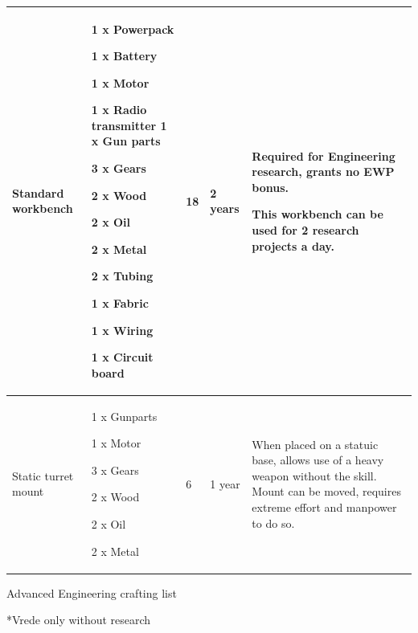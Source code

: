 \begin{table}
\begin{tabular}{|l|l|l|l|l|}
 \hline Standard workbench & 1 x Powerpack\par 1 x Battery\par 1 x Motor\par 1 x Radio transmitter 1 x Gun parts\par 3 x Gears\par 2 x Wood\par 2 x Oil\par 2 x Metal\par 2 x Tubing\par 1 x Fabric\par 1 x Wiring\par 1 x Circuit board & 18 & 2 years & Required for Engineering research, grants no EWP bonus.\par This workbench can be used for 2 research projects a day. \\
 \hline Static turret mount & 1 x Gunparts\par 1 x Motor\par 3 x Gears\par 2 x Wood\par 2 x Oil\par 2 x Metal & 6 & 1 year & When placed on a statuic base, allows use of a heavy weapon without the skill. Mount can be moved, requires extreme effort and manpower to do so. \\
 \hline \end{tabular}

\end{table}

Advanced Engineering crafting list

*Vrede only without research

